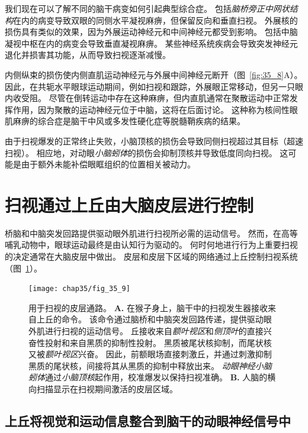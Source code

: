 我们现在可以了解不同的脑干病变如何引起典型综合症。
包括\textit{脑桥旁正中网状结构}在内的病变导致双眼的同侧水平凝视麻痹，但保留反向和垂直扫视。
外展核的损伤具有类似的效果，因为外展运动神经元和中间神经元都受到影响。
包括中脑凝视中枢在内的病变会导致垂直凝视麻痹。
某些神经系统疾病会导致突发神经元退化并损害其功能，从而导致扫视逐渐减慢。


内侧纵束的损伤使内侧直肌运动神经元与外展中间神经元断开（图~\ref{fig:35_8}A）。
因此，在共轭水平眼球运动期间，例如扫视和跟踪，外展眼正常移动，但另一只眼内收受阻。
尽管在倒转运动中存在这种麻痹，但内直肌通常在聚散运动中正常发挥作用，因为聚散的运动神经元位于中脑，这将在后面讨论。
这种称为核间性眼肌麻痹的综合症是脑干中风或多发性硬化症等脱髓鞘疾病的结果。


由于扫视爆发的正常终止失败，小脑顶核的损伤会导致同侧扫视超过其目标（超速扫视）。
相应地，对动眼\textit{小脑蚓体}的损伤会抑制顶核并导致低度同向扫视。
这可能是由于额外未能补偿眼眶组织的位置相关被动力。



\section{扫视通过上丘由大脑皮层进行控制}

桥脑和中脑突发回路提供驱动眼外肌进行扫视所必需的运动信号。
然而，在高等哺乳动物中，眼球运动最终是由认知行为驱动的。
何时何地进行行为上重要扫视的决定通常在大脑皮层中做出。
皮层和皮层下区域的网络通过上丘控制扫视系统（图~\ref{fig:35_9}）。


\begin{figure}[htbp]
	\centering
	\texttt{[image: chap35/fig\_35\_9]}
	\caption{用于扫视的皮层通路。
		\textbf{A.} 在猴子身上，脑干中的扫视发生器接收来自上丘的命令。
		该命令通过脑桥和中脑突发回路传递，提供驱动眼外肌进行扫视的运动信号。
		丘接收来自\textit{额叶视区}和\textit{侧顶叶}的直接兴奋性投射和来自黑质的抑制性投射。
		黑质被尾状核抑制，而尾状核又被\textit{额叶视区}兴奋。
		因此，前额眼场直接刺激丘，并通过刺激抑制黑质的尾状核，间接将其从黑质的抑制中释放出来。
		\textit{动眼神经小脑蚓体}通过\textit{小脑顶核}起作用，校准爆发以保持扫视准确。
		\textbf{B.} 人脑的横向扫描显示在扫视期间激活的皮层区域\cite{curtis2008saccade}。}
	\label{fig:35_9}
\end{figure}



\subsection{上丘将视觉和运动信息整合到脑干的动眼神经信号中}

